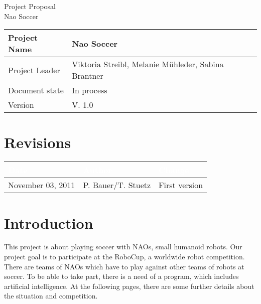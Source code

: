 \documentclass[12pt]{article}
\newcommand{\projectname}{Nao Soccer}
\newcommand{\productname}{Nao Soccer}
\newcommand{\projectleader}{Viktoria Streibl, Melanie Mühleder, Sabina Brantner}
\newcommand{\documentstatus}{In process}
\newcommand{\version}{V. 1.0}
\begin{document}
\begin{titlepage}

\vspace{10em}

\begin{center}
{\Huge Project Proposal} \\[3em]
{\LARGE \productname} \\[3em]
\end{center}

\begin{flushleft}
\begin{tabular}{|l|l|}
\hline
Project Name & \projectname \\ \hline
Project Leader & \projectleader \\ \hline
Document state & \documentstatus \\ \hline
Version & \version \\ \hline
\end{tabular}
\end{flushleft}

\end{titlepage}
\section*{Revisions}
\begin{tabular}{|l|l|l|}
\hline
\cellcolor[gray]{0.5}\textcolor{white}{Date} & \cellcolor[gray]{0.5}\textcolor{white}{Author} & \cellcolor[gray]{0.5}\textcolor{white}{Change} \\ \hline
November 03, 2011&P. Bauer/T. Stuetz&First version \\ \hline
\end{tabular}
\pagebreak

\tableofcontents
\pagebreak

\section{Introduction}
This project is about playing soccer with NAOs, small humanoid robots. Our project goal is to participate at the RoboCup, a worldwide robot competition. There are teams of NAOs which have to play against other teams of robots at soccer. To be able to take part, there is a need of a program, which includes artificial intelligence.  At the following pages, there are some further details about the situation and competition. 
\pagebreak
\end{document}
